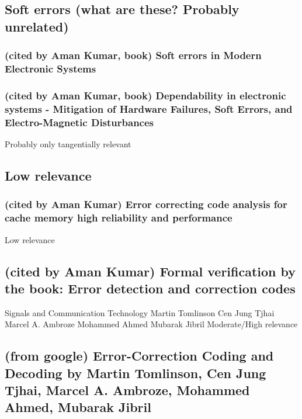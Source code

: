 \documentclass{article}
\begin{document}
\subsection{Soft errors (what are these? Probably unrelated)}

\subsubsection{(cited by Aman Kumar, book) Soft errors in Modern Electronic Systems}

\subsubsection{(cited by Aman Kumar, book) Dependability in electronic systems - Mitigation of Hardware Failures, Soft Errors, and Electro-Magnetic Disturbances}

Probably only tangentially relevant


\subsection{Low relevance}

\subsubsection{(cited by Aman Kumar) Error correcting code analysis for cache memory high reliability and performance}

Low relevance


\subsection{(cited by Aman Kumar) Formal verification by the book: Error detection and correction codes}
Signals and Communication Technology
Martin Tomlinson
Cen Jung Tjhai
Marcel A. Ambroze
Mohammed Ahmed
Mubarak Jibril
Moderate/High relevance

\subsection {(from google) Error-Correction Coding and Decoding by Martin Tomlinson, Cen Jung Tjhai, Marcel A. Ambroze, Mohammed Ahmed, Mubarak Jibril}
\end{document}
